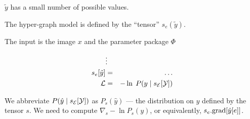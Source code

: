 \vfill
{\color{red} $\tilde{y}$ has a small number of possible values.}

\vfill
The hyper-graph model is defined by the ``tensor'' {\color{red} $s_e(\tilde{y})$}.



The input is the image $x$ and the parameter package $\Phi$

\begin{eqnarray*}
 & \vdots & \\
s_e[\tilde{y}] & = & \ldots \\
{\cal L} & = & - \ln\; P(y\;|\;s_{\cal E}[{\cal Y}])
\end{eqnarray*}

\vfill We abbreviate $P(\hat{y}\;|\;s_{\cal E}[{\cal Y}])$ as {\color{red} $P_s(\hat{y})$} --- the distribution on $\hat{y}$ defined by the tensor $s$.
\vfill
We need to compute {\color{red} $\nabla_s -\ln P_s(y)$}, or equivalently, {\color{red} $s_e.\mathrm{grad}[\hat{y}[e]]$}.


